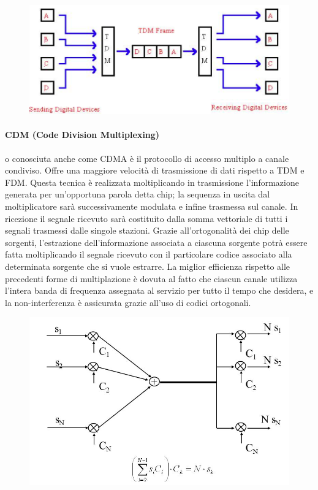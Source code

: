 \begin{figure}[H]
\centering
\includegraphics[scale=0.5]{res/img/11_TDM.png}
\end{figure} 

\paragraph{CDM (Code Division Multiplexing)} o conosciuta anche come CDMA è il protocollo di accesso multiplo a canale condiviso. Offre una maggiore velocità di trasmissione di dati rispetto a TDM e FDM.
Questa tecnica è realizzata moltiplicando in trasmissione l’informazione generata per un’opportuna parola detta chip; la sequenza in uscita dal moltiplicatore sarà successivamente modulata e infine trasmessa sul canale.
In ricezione il segnale ricevuto sarà costituito dalla somma vettoriale di tutti i segnali trasmessi dalle singole stazioni. Grazie all’ortogonalità dei chip delle sorgenti, l’estrazione dell’informazione associata a ciascuna sorgente potrà essere fatta moltiplicando il segnale ricevuto con il particolare codice associato alla determinata sorgente che si vuole estrarre.
La miglior efficienza rispetto alle precedenti forme di multiplazione è dovuta al fatto che ciascun canale utilizza l’intera banda di frequenza assegnata al servizio per tutto il tempo che desidera, e la non-interferenza è assicurata grazie all’uso di codici ortogonali.

\begin{figure}[H]
\centering
\includegraphics[scale=0.5]{res/img/11_CDM.png}
\end{figure}
 
